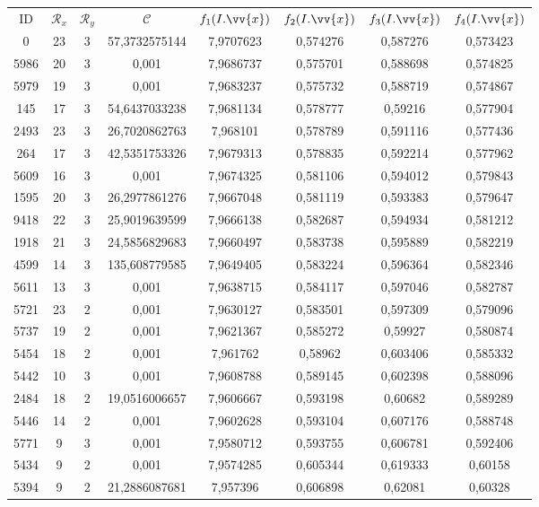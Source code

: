 \scriptsize
\begin{longtable}{|c|c|c|c|c|c|c|c|}
\hline
ID & $\mathscr{R}_x$ & $\mathscr{R}_y$ & $\mathscr{C}$ & $f_1(I.\vv{x})$ & $f_2(I.\vv{x})$ & $f_3(I.\vv{x})$ & $f_4(I.\vv{x})$ \\
0 & 23 & 3 & 57,3732575144 & 7,9707623 & 0,574276 & 0,587276 & 0,573423 \\
5986 & 20 & 3 & 0,001 & 7,9686737 & 0,575701 & 0,588698 & 0,574825 \\
5979 & 19 & 3 & 0,001 & 7,9683237 & 0,575732 & 0,588719 & 0,574867 \\
145 & 17 & 3 & 54,6437033238 & 7,9681134 & 0,578777 & 0,59216 & 0,577904 \\
2493 & 23 & 3 & 26,7020862763 & 7,968101 & 0,578789 & 0,591116 & 0,577436 \\
264 & 17 & 3 & 42,5351753326 & 7,9679313 & 0,578835 & 0,592214 & 0,577962 \\
5609 & 16 & 3 & 0,001 & 7,9674325 & 0,581106 & 0,594012 & 0,579843 \\
1595 & 20 & 3 & 26,2977861276 & 7,9667048 & 0,581119 & 0,593383 & 0,579647 \\
9418 & 22 & 3 & 25,9019639599 & 7,9666138 & 0,582687 & 0,594934 & 0,581212 \\
1918 & 21 & 3 & 24,5856829683 & 7,9660497 & 0,583738 & 0,595889 & 0,582219 \\
4599 & 14 & 3 & 135,608779585 & 7,9649405 & 0,583224 & 0,596364 & 0,582346 \\
5611 & 13 & 3 & 0,001 & 7,9638715 & 0,584117 & 0,597046 & 0,582787 \\
5721 & 23 & 2 & 0,001 & 7,9630127 & 0,583501 & 0,597309 & 0,579096 \\
5737 & 19 & 2 & 0,001 & 7,9621367 & 0,585272 & 0,59927 & 0,580874 \\
5454 & 18 & 2 & 0,001 & 7,961762 & 0,58962 & 0,603406 & 0,585332 \\
5442 & 10 & 3 & 0,001 & 7,9608788 & 0,589145 & 0,602398 & 0,588096 \\
2484 & 18 & 2 & 19,0516006657 & 7,9606667 & 0,593198 & 0,60682 & 0,589289 \\
5446 & 14 & 2 & 0,001 & 7,9602628 & 0,593104 & 0,607176 & 0,588748 \\
5771 & 9 & 3 & 0,001 & 7,9580712 & 0,593755 & 0,606781 & 0,592406 \\
5434 & 9 & 2 & 0,001 & 7,9574285 & 0,605344 & 0,619333 & 0,60158 \\
5394 & 9 & 2 & 21,2886087681 & 7,957396 & 0,606898 & 0,62081 & 0,60328 \\

\end{longtable}

